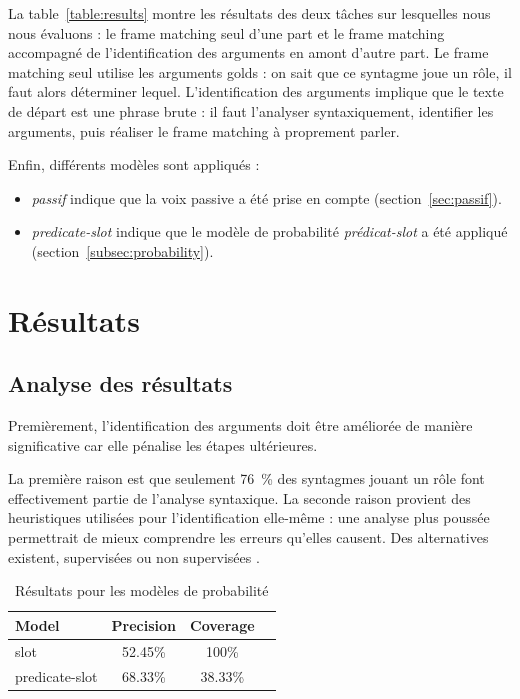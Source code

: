 La table~\ref{table:results} montre les résultats des deux tâches sur
lesquelles nous nous évaluons : le frame matching seul d'une part et le frame
matching accompagné de l'identification des arguments en amont d'autre part. Le
frame matching seul utilise les arguments golds : on sait que ce syntagme joue
un rôle, il faut alors déterminer lequel. L'identification des arguments
implique que le texte de départ est une phrase brute : il faut l'analyser
syntaxiquement, identifier les arguments, puis réaliser le frame matching à
proprement parler.

Enfin, différents modèles sont appliqués :

\begin{itemize}

    \item \emph{passif} indique que la voix passive a été prise en compte
    (section~\ref{sec:passif}).

    \item \emph{predicate-slot} indique que le modèle de probabilité
    \emph{prédicat-slot} a été appliqué (section~\ref{subsec:probability}).

\end{itemize}

\section{Résultats}

\subsection{Analyse des résultats}

Premièrement, l'identification des arguments doit être améliorée de manière
significative car elle pénalise les étapes ultérieures.

La première raison est que seulement 76~\% des syntagmes jouant un rôle font
effectivement partie de l'analyse syntaxique.
La seconde raison provient des heuristiques utilisées pour l'identification
elle-même : une analyse plus poussée permettrait de mieux comprendre les
erreurs qu'elles causent. Des alternatives existent, supervisées ou non
supervisées \citep{abend2009unsupervised}.

\begin{table}[ht]
    \centering
    \begin{tabular}{lccc}
        \toprule
        Model          & Precision & Coverage \\
        \midrule
        slot           & 52.45\% & 100\% \\
        predicate-slot & 68.33\% & 38.33\% \\
        \bottomrule
    \end{tabular}
    \caption{\protect\centering\label{table:probabilisticresults}Résultats pour les modèles de probabilité}
\end{table}

